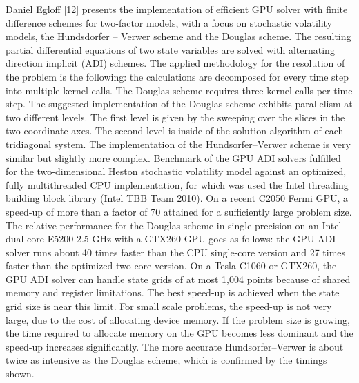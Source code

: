 Daniel Egloff [12] presents the implementation of efficient GPU solver with finite difference schemes for two-factor models, with a focus on stochastic volatility models, the Hundsdorfer – Verwer scheme and the Douglas scheme. The resulting partial differential equations of two state variables are solved with alternating direction implicit (ADI) schemes. The applied methodology for the resolution of the problem is the following: the calculations are decomposed for every time step into multiple kernel calls. The Douglas scheme requires three kernel calls per time step. The suggested implementation of the Douglas scheme exhibits parallelism at two different levels. The first level is given by the sweeping over the slices in the two coordinate axes. The second level is inside of the solution algorithm of each tridiagonal system. The implementation of the Hundsorfer–Verwer scheme is very similar but slightly more complex. Benchmark of the GPU ADI solvers fulfilled for the two-dimensional Heston stochastic volatility model against an optimized, fully multithreaded CPU implementation, for which was used the Intel threading building block library (Intel TBB Team 2010). On a recent C2050 Fermi GPU, a speed-up of more than a factor of 70 attained for a sufficiently large problem size. The relative performance for the Douglas scheme in single precision on an Intel dual core E5200 2.5 GHz with a GTX260 GPU goes as follows: the GPU ADI solver runs about 40 times faster than the CPU single-core version and 27 times faster than the optimized two-core version. On a Tesla C1060 or GTX260, the GPU ADI solver can handle state grids of at most 1,004 points because of shared memory and register limitations. The best speed-up is achieved when the state grid size is near this limit. For small scale problems, the speed-up is not very large, due to the cost of allocating device memory. If the problem size is growing, the time required to allocate memory on the GPU becomes less dominant and the speed-up increases significantly. The more accurate Hundsorfer–Verwer is about twice as intensive as the Douglas scheme, which is confirmed by the timings shown.

